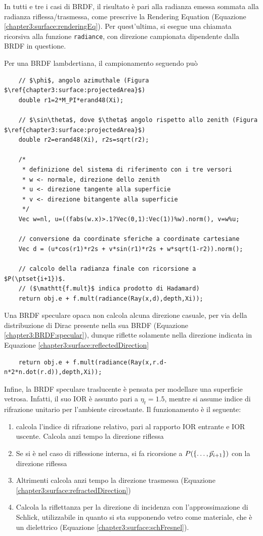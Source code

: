 In tutti e tre i casi di BRDF, il risultato \`e pari alla radianza emessa sommata alla radianza riflessa/trasmessa, come prescrive 
la Rendering Equation (Equazione \ref{chapter3:surface:renderingEq}). Per quest'ultima, si esegue una chiamata ricorsiva alla funzione 
\texttt{radiance}, con direzione campionata dipendente dalla BRDF in questione.\par
Per una BRDF lambdertiana, il campionamento seguendo pu\`o 
\begin{verbatim}
	// $\phi$, angolo azimuthale (Figura $\ref{chapter3:surface:projectedArea}$)
	double r1=2*M_PI*erand48(Xi);

	// $\sin\theta$, dove $\theta$ angolo rispetto allo zenith (Figura $\ref{chapter3:surface:projectedArea}$)
	double r2=erand48(Xi), r2s=sqrt(r2);

	/*
	 * definizione del sistema di riferimento con i tre versori
	 * w <- normale, direzione dello zenith
	 * u <- direzione tangente alla superficie
	 * v <- direzione bitangente alla superficie
	 */
	Vec w=nl, u=((fabs(w.x)>.1?Vec(0,1):Vec(1))%w).norm(), v=w%u;

	// conversione da coordinate sferiche a coordinate cartesiane
	Vec d = (u*cos(r1)*r2s + v*sin(r1)*r2s + w*sqrt(1-r2)).norm();

	// calcolo della radianza finale con ricorsione a $P(\ptset{i+1})$.
	// ($\mathtt{f.mult}$ indica prodotto di Hadamard)
	return obj.e + f.mult(radiance(Ray(x,d),depth,Xi));
\end{verbatim}
Una BRDF speculare opaca non calcola alcuna direzione casuale, per via della distribuzione di Dirac presente nella sua BRDF 
(Equazione \ref{chapter3:BRDF:specular}), dunque riflette solamente nella direzione indicata in Equazione \ref{chapter3:surface:reflectedDirection}
\begin{verbatim}
	return obj.e + f.mult(radiance(Ray(x,r.d-n*2*n.dot(r.d)),depth,Xi));
\end{verbatim}
Infine, la BRDF speculare traslucente \`e pensata per modellare una superficie vetrosa. Infatti, il suo IOR \`e assunto pari a $\eta_t=1.5$, mentre 
si assume indice di rifrazione unitario per l'ambiente circostante. Il funzionamento \`e il seguente:
\begin{enumerate}[topsep=0pt,noitemsep]
	\item calcola l'indice di rifrazione relativo, pari al rapporto IOR entrante e IOR uscente. Calcola anzi tempo la direzione riflessa
	\item Se si \`e nel caso di riflessione interna, si fa ricorsione a $P(\{\ldots,\vec{p}_{i+1}\})$ con la direzione riflessa
	\item Altrimenti calcola anzi tempo la direzione trasmessa (Equazione \ref{chapter3:surface:refractedDirection})
	\item Calcola la riflettanza per la direzione di incidenza con l'approssimazione di Schlick, utilizzabile in quanto si sta supponendo vetro 
		come materiale, che \`e un dielettrico (Equazione \ref{chapter3:surface:schFresnel}).
\end{enumerate}
